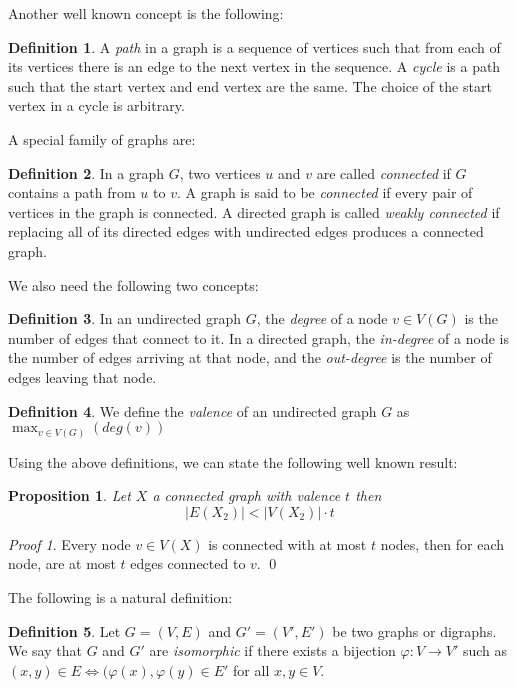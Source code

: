 \documentclass[12pt,a4paper]{book}
\theoremstyle{plain}
\newtheorem{proposition}{Proposition}
\theoremstyle{definition}
\newtheorem{definition}{Definition}
\theoremstyle{remark}
\newtheorem*{Proof}{Proof}
\begin{document}
Another well known concept is the following:

\begin{definition}
 A \emph{path} in a graph is a sequence of vertices such that from each of its vertices there is an edge to the next vertex in the sequence. 
A \emph{cycle}  is a path such that the start vertex and end vertex are the same. The choice of the start vertex in a cycle is 
arbitrary.
\end{definition}

A special family of graphs are:
\begin{definition}
 In a graph $G$, two vertices $u$ and $v$ are called \emph{connected} if $G$ contains a path from $u$ to $v$. A graph is said to 
be \emph{connected} if every pair of vertices in the graph is connected. A directed graph is called \emph{weakly connected} if replacing all 
of its directed edges with undirected edges produces a connected graph.
\end{definition}

We also  need the following two concepts:
\begin{definition}
 In an undirected graph $G$, the \emph{degree} of a node $v \in V(G)$ is the number of edges that connect to it.
In a directed graph, the \emph{in-degree} of a node is the number of edges arriving at that node, and the \emph{out-degree} is the 
number of edges leaving that node.
\end{definition}

\begin{definition}
We define the \emph{valence} of an undirected graph $G$ as $\max_{v \in V(G)} ( deg(v))$
\end{definition}

Using the above definitions, we can state the following well known result: 
\begin{proposition}
Let $X$ a connected graph with valence $t$ then
\[|E(X_2)| < |V(X_2)| \cdot t \]
\end{proposition}

\begin{Proof}
Every node $v \in V(X)$ is connected with at most $t$ nodes, then for each node, are at most $t$ edges connected to $v$.
\qed  \end{Proof}

The following is a natural definition:

\begin{definition}
 Let $G=(V,E)$ and $G'=(V',E')$ be two graphs or digraphs. We say that $G$ and $G'$ are \emph{isomorphic} if there exists a bijection 
$\varphi: V \rightarrow V'$ such as $(x,y) \in E \Leftrightarrow (\varphi(x), \varphi(y) \in E'$ for all $x,y \in V$.
\end{definition}
\end{document}

